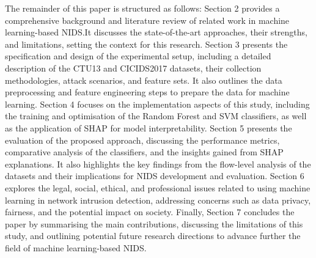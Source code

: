 The remainder of this paper is structured as follows: Section 2 provides a comprehensive background and literature review of related work in machine learning-based NIDS.\@ It discusses the state-of-the-art approaches, their strengths, and limitations, setting the context for this research. Section 3 presents the specification and design of the experimental setup, including a detailed description of the CTU13 and CICIDS2017 datasets, their collection methodologies, attack scenarios, and feature sets. It also outlines the data preprocessing and feature engineering steps to prepare the data for machine learning. Section 4 focuses on the implementation aspects of this study, including the training and optimisation of the Random Forest and SVM classifiers, as well as the application of SHAP for model interpretability. Section 5 presents the evaluation of the proposed approach, discussing the performance metrics, comparative analysis of the classifiers, and the insights gained from SHAP explanations. It also highlights the key findings from the flow-level analysis of the datasets and their implications for NIDS development and evaluation. Section 6 explores the legal, social, ethical, and professional issues related to using machine learning in network intrusion detection, addressing concerns such as data privacy, fairness, and the potential impact on society. Finally, Section 7 concludes the paper by summarising the main contributions, discussing the limitations of this study, and outlining potential future research directions to advance further the field of machine learning-based NIDS.\@